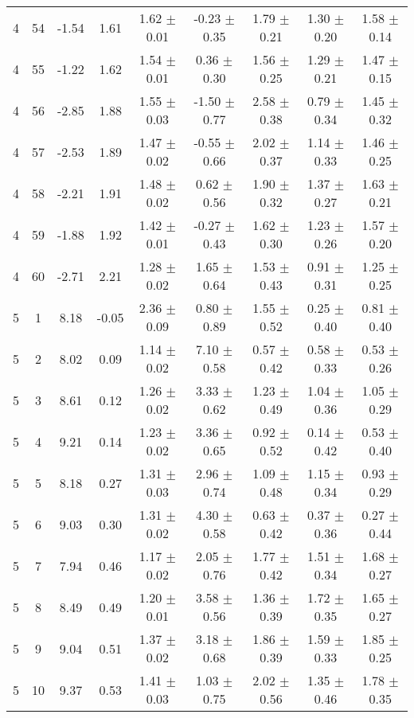 \begin{landscape}
\begin{longtable}{ccccccccc}
   4 & 54 & -1.54 & 1.61 & 1.62 $\pm$ 0.01 & -0.23 $\pm$ 0.35 & 1.79 $\pm$ 0.21 & 1.30 $\pm$ 0.20 & 1.58 $\pm$ 0.14\\
   4 & 55 & -1.22 & 1.62 & 1.54 $\pm$ 0.01 & 0.36 $\pm$ 0.30 & 1.56 $\pm$ 0.25 & 1.29 $\pm$ 0.21 & 1.47 $\pm$ 0.15\\
   4 & 56 & -2.85 & 1.88 & 1.55 $\pm$ 0.03 & -1.50 $\pm$ 0.77 & 2.58 $\pm$ 0.38 & 0.79 $\pm$ 0.34 & 1.45 $\pm$ 0.32\\
   4 & 57 & -2.53 & 1.89 & 1.47 $\pm$ 0.02 & -0.55 $\pm$ 0.66 & 2.02 $\pm$ 0.37 & 1.14 $\pm$ 0.33 & 1.46 $\pm$ 0.25\\
   4 & 58 & -2.21 & 1.91 & 1.48 $\pm$ 0.02 & 0.62 $\pm$ 0.56 & 1.90 $\pm$ 0.32 & 1.37 $\pm$ 0.27 & 1.63 $\pm$ 0.21\\
   4 & 59 & -1.88 & 1.92 & 1.42 $\pm$ 0.01 & -0.27 $\pm$ 0.43 & 1.62 $\pm$ 0.30 & 1.23 $\pm$ 0.26 & 1.57 $\pm$ 0.20\\
   4 & 60 & -2.71 & 2.21 & 1.28 $\pm$ 0.02 & 1.65 $\pm$ 0.64 & 1.53 $\pm$ 0.43 & 0.91 $\pm$ 0.31 & 1.25 $\pm$ 0.25\\
 5 &  1 & 8.18 & -0.05 & 2.36 $\pm$ 0.09 & 0.80 $\pm$ 0.89 & 1.55 $\pm$ 0.52 & 0.25 $\pm$ 0.40 & 0.81 $\pm$ 0.40\\
 5 &  2 & 8.02 & 0.09 & 1.14 $\pm$ 0.02 & 7.10 $\pm$ 0.58 & 0.57 $\pm$ 0.42 & 0.58 $\pm$ 0.33 & 0.53 $\pm$ 0.26\\
   5 &  3 & 8.61 & 0.12 & 1.26 $\pm$ 0.02 & 3.33 $\pm$ 0.62 & 1.23 $\pm$ 0.49 & 1.04 $\pm$ 0.36 & 1.05 $\pm$ 0.29\\
   5 &  4 & 9.21 & 0.14 & 1.23 $\pm$ 0.02 & 3.36 $\pm$ 0.65 & 0.92 $\pm$ 0.52 & 0.14 $\pm$ 0.42 & 0.53 $\pm$ 0.40\\
   5 &  5 & 8.18 & 0.27 & 1.31 $\pm$ 0.03 & 2.96 $\pm$ 0.74 & 1.09 $\pm$ 0.48 & 1.15 $\pm$ 0.34 & 0.93 $\pm$ 0.29\\
   5 &  6 & 9.03 & 0.30 & 1.31 $\pm$ 0.02 & 4.30 $\pm$ 0.58 & 0.63 $\pm$ 0.42 & 0.37 $\pm$ 0.36 & 0.27 $\pm$ 0.44\\
   5 &  7 & 7.94 & 0.46 & 1.17 $\pm$ 0.02 & 2.05 $\pm$ 0.76 & 1.77 $\pm$ 0.42 & 1.51 $\pm$ 0.34 & 1.68 $\pm$ 0.27\\
   5 &  8 & 8.49 & 0.49 & 1.20 $\pm$ 0.01 & 3.58 $\pm$ 0.56 & 1.36 $\pm$ 0.39 & 1.72 $\pm$ 0.35 & 1.65 $\pm$ 0.27\\
   5 &  9 & 9.04 & 0.51 & 1.37 $\pm$ 0.02 & 3.18 $\pm$ 0.68 & 1.86 $\pm$ 0.39 & 1.59 $\pm$ 0.33 & 1.85 $\pm$ 0.25\\
   5 & 10 & 9.37 & 0.53 & 1.41 $\pm$ 0.03 & 1.03 $\pm$ 0.75 & 2.02 $\pm$ 0.56 & 1.35 $\pm$ 0.46 & 1.78 $\pm$ 0.35\\

\end{longtable}
\end{landscape}
